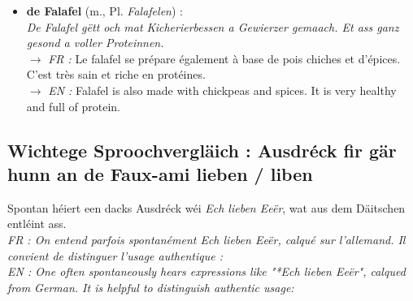 \begin{itemize}
\begin{itemize}
        $\rightarrow$ \textit{EN :} How many chickpeas do you need to make hummus for four people?
        \item \textbf{de Falafel} (m., Pl. \textit{Falafelen}) : \\
        \textit{De Falafel gëtt och mat Kicherierbessen a Gewierzer gemaach. Et ass ganz gesond a voller Proteinnen.} \\
        $\rightarrow$ \textit{FR :} Le falafel se prépare également à base de pois chiches et d'épices. C'est très sain et riche en protéines. \\
        $\rightarrow$ \textit{EN :} Falafel is also made with chickpeas and spices. It is very healthy and full of protein.
    \end{itemize}
\end{itemize}

\subsection{Wichtege Sproochvergläich : Ausdréck fir \flqq gär hunn\frqq{} an de Faux-ami \flqq *lieben\frqq{} / \flqq liben\frqq}

Spontan héiert een dacks Ausdréck wéi \textit{\flqq *Ech lieben Eeër\frqq}, wat aus dem Däitschen entléint ass. \\
\textit{FR : On entend parfois spontanément \flqq *Ech lieben Eeër\frqq, calqué sur l'allemand. Il convient de distinguer l'usage authentique :} \\
\textit{EN : One often spontaneously hears expressions like "*Ech lieben Eeër", calqued from German. It is helpful to distinguish authentic usage:}

